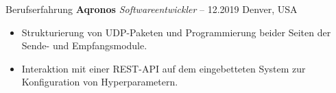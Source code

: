 \begin{rubric}{Berufserfahrung}
%
%
\entry*[] \textbf{Aqronos} \hfill \textit{Softwareentwickler}  -- 12.2019 \hfill Denver, USA \newline  
\vspace{\CVItemizeHeaderSpacing} \begin{itemize} 
	\setlength{\itemsep}{\CVItemizeSpacing}  
	\item Strukturierung von UDP-Paketen und Programmierung beider Seiten der Sende- und Empfangsmodule.  
	\item Interaktion mit einer REST-API auf dem eingebetteten System zur Konfiguration von Hyperparametern.  
\end{itemize}


\begin{comment}
%
%
\entry*[] \textbf{Creative Edge LLC} \hfill \textit{Softwareentwickler} \newline  
08.2017 -- 09.2018 \hfill Denver, USA \newline  
\vspace{\CVItemizeHeaderSpacing} \begin{itemize}  
	\setlength{\itemsep}{\CVItemizeSpacing}  
	\item Entwicklung von Anwendungen für das Kryptowährungs-Mining unter Windows und Linux.  
	\item Erstellung von Software zur Verwaltung von Betriebssystemtreibern, Systemkonfigurationen und Tools von Drittanbietern.  
\end{itemize}
\end{comment}
\end{rubric}
